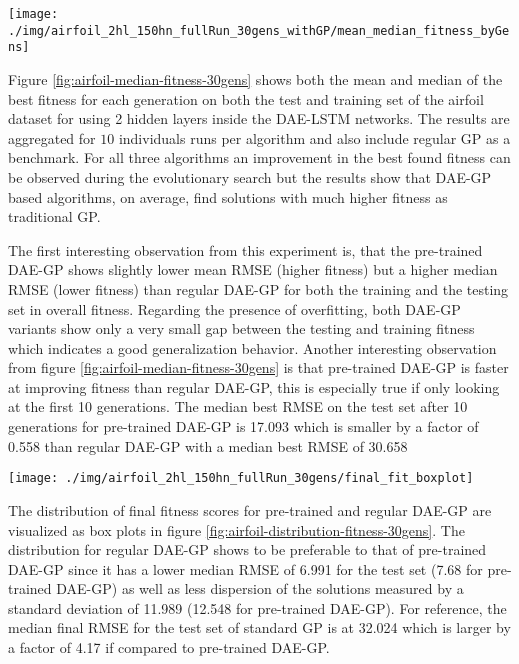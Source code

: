 \documentclass[
  11pt,
]{article}
\let\origfigure\figure
\let\endorigfigure\endfigure
\renewenvironment{figure}[1][2] {
    \expandafter\origfigure\expandafter[H]
} {
    \endorigfigure
}
\begin{document}
\begin{figure}[c]

{\centering \texttt{[image: ./img/airfoil\_2hl\_150hn\_fullRun\_30gens\_withGP/mean\_median\_fitness\_byGens]} 

}

\caption{Best Fitness over 30 Generations - Airfoil}\label{fig:airfoil-median-fitness-30gens}
\end{figure}

Figure \ref{fig:airfoil-median-fitness-30gens} shows both the mean and median of the best fitness for each generation on both the test and training set of the airfoil dataset for using 2 hidden layers inside the DAE-LSTM networks.
The results are aggregated for \(10\) individuals runs per algorithm and also include regular GP as a benchmark.
For all three algorithms an improvement in the best found fitness can be observed during the evolutionary search but the results show that DAE-GP based algorithms, on average, find solutions with much higher fitness as traditional GP.

The first interesting observation from this experiment is, that the pre-trained DAE-GP shows slightly lower mean RMSE (higher fitness) but a higher median RMSE (lower fitness) than regular DAE-GP for both the training and the testing set in overall fitness.
Regarding the presence of overfitting, both DAE-GP variants show only a very small gap between the testing and training fitness which indicates a good generalization behavior.
Another interesting observation from figure \ref{fig:airfoil-median-fitness-30gens} is that pre-trained DAE-GP is faster at improving fitness than regular DAE-GP, this is especially true if only looking at the first 10 generations.
The median best RMSE on the test set after 10 generations for pre-trained DAE-GP is 17.093 which is smaller by a factor of 0.558 than regular DAE-GP with a median best RMSE of 30.658

\begin{figure}[c]

{\centering \texttt{[image: ./img/airfoil\_2hl\_150hn\_fullRun\_30gens/final\_fit\_boxplot]} 

}

\caption{Best Fitness after 30 Generations - Airfoil}\label{fig:airfoil-distribution-fitness-30gens}
\end{figure}

The distribution of final fitness scores for pre-trained and regular DAE-GP are visualized as box plots in figure \ref{fig:airfoil-distribution-fitness-30gens}.
The distribution for regular DAE-GP shows to be preferable to that of pre-trained DAE-GP since it has a lower median RMSE of 6.991 for the test set (7.68 for pre-trained DAE-GP) as well as less dispersion of the solutions measured by a standard deviation of 11.989 (12.548 for pre-trained DAE-GP).
For reference, the median final RMSE for the test set of standard GP is at 32.024 which is larger by a factor of 4.17 if compared to pre-trained DAE-GP.
\end{document}
